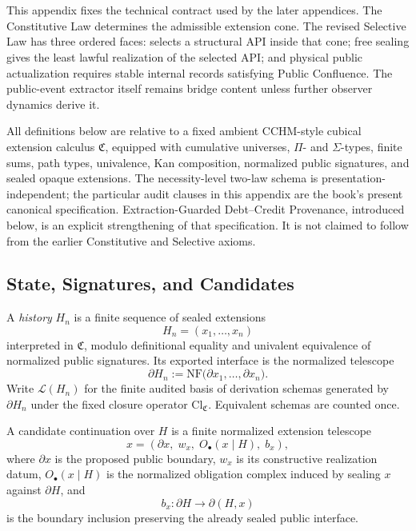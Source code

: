 \chapter[Formal Two-Law Schema]{}\label{app:two-laws}

This appendix fixes the technical contract used by the later appendices. The
Constitutive Law determines the admissible extension cone. The revised
Selective Law has three ordered faces: \PEN{} selects a structural API inside
that cone; free sealing gives the least lawful realization of the selected API;
and physical public actualization requires stable internal records satisfying
Public Confluence. The public-event extractor itself remains bridge content
unless further observer dynamics derive it.

All definitions below are relative to a fixed ambient CCHM-style cubical
extension calculus \(\mathfrak{C}\), equipped with cumulative universes,
\(\Pi\)- and \(\Sigma\)-types, finite sums, path types, univalence, Kan
composition, normalized public signatures, and sealed opaque extensions. The
necessity-level two-law schema is presentation-independent; the particular
audit clauses in this appendix are the book's present canonical specification.
Extraction-Guarded Debt--Credit Provenance, introduced below, is an explicit
strengthening of that specification. It is not claimed to follow from the
earlier Constitutive and Selective axioms.

\section{State, Signatures, and Candidates}

\begin{definition}
A \emph{history} \(H_n\) is a finite sequence of sealed extensions
\[
H_n = (x_1,\dots,x_n)
\]
interpreted in \(\mathfrak{C}\), modulo definitional equality and univalent
equivalence of normalized public signatures. Its exported interface is the
normalized telescope
\[
\partial H_n := \mathrm{NF}\bigl(\partial x_1,\dots,\partial x_n\bigr).
\]
Write \(\mathcal{L}(H_n)\) for the finite audited basis of derivation schemas
generated by \(\partial H_n\) under the fixed closure operator
\(\mathrm{Cl}_{\mathfrak{C}}\). Equivalent schemas are counted once.
\end{definition}

\begin{definition}
A candidate continuation over \(H\) is a finite normalized extension telescope
\[
x = (\partial x,\; w_x,\; O_\bullet(x\mid H),\; b_x),
\]
where \(\partial x\) is the proposed public boundary, \(w_x\) is its constructive
realization datum, \(O_\bullet(x\mid H)\) is the normalized obligation complex
induced by sealing \(x\) against \(\partial H\), and
\[
b_x : \partial H \longrightarrow \partial(H,x)
\]
is the boundary inclusion preserving the already sealed public interface.
\end{definition}

